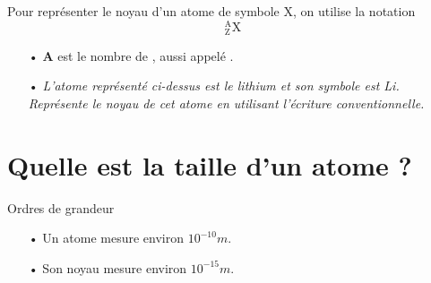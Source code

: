 \documentclass[12pt,a4paper]{article}
\begin{document}
\begin{definition}
Pour représenter le noyau d'un atome de symbole X, on utilise la notation
{\Huge \bf
\[
^\text{A} _\text{Z} \text{X}
\]
}
\begin{itemize}
\item[•] \textbf{A} est le nombre de \underline{\phantom{nucléons nucléons}}, aussi appelé \underline{\phantom{nombre de masse nombre de masse}}.
\end{itemize}
\end{definition}

\begin{itemize}
\item[•] \emph{L'atome représenté ci-dessus est le lithium et son symbole est Li.
Représente le noyau de cet atome en utilisant l'écriture conventionnelle.}
\end{itemize}

\section{Quelle est la taille d'un atome ?}

\begin{definition}
Ordres de grandeur
\begin{itemize}
\item[•] Un atome mesure environ $\unit{10^{-10}}{m}$.
\item[•] Son noyau mesure environ $\unit{10^{-15}}{m}$.
\end{itemize}
\end{definition}
\end{document}
